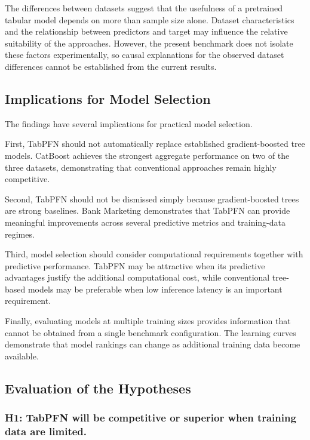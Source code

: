 The differences between datasets suggest that the usefulness of a pretrained tabular model depends on more than sample size alone. Dataset characteristics and the relationship between predictors and target may influence the relative suitability of the approaches. However, the present benchmark does not isolate these factors experimentally, so causal explanations for the observed dataset differences cannot be established from the current results.

\subsection{Implications for Model Selection}\label{implications-for-model-selection}

The findings have several implications for practical model selection.

First, TabPFN should not automatically replace established gradient-boosted tree models. CatBoost achieves the strongest aggregate performance on two of the three datasets, demonstrating that conventional approaches remain highly competitive.

Second, TabPFN should not be dismissed simply because gradient-boosted trees are strong baselines. Bank Marketing demonstrates that TabPFN can provide meaningful improvements across several predictive metrics and training-data regimes.

Third, model selection should consider computational requirements together with predictive performance. TabPFN may be attractive when its predictive advantages justify the additional computational cost, while conventional tree-based models may be preferable when low inference latency is an important requirement.

Finally, evaluating models at multiple training sizes provides information that cannot be obtained from a single benchmark configuration. The learning curves demonstrate that model rankings can change as additional training data become available.

\subsection{Evaluation of the Hypotheses}\label{evaluation-of-the-hypotheses}

\subsubsection{H1: TabPFN will be competitive or superior when training data are limited.}\label{h1-tabpfn-will-be-competitive-or-superior-when-training-data-are-limited.}

